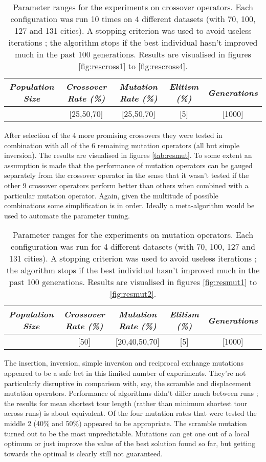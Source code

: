 \begin{table}[h]
\centering
\begin{tabular}{c|c|c|c|c}
\textit{Population Size} & \textit{Crossover Rate (\%)} & \textit{Mutation Rate (\%)} & \textit{Elitism (\%)} & \textit{Generations} \\\hline 
[300] & [25,50,70] & [25,50,70] & [5] & [1000]
\end{tabular}
\caption{Parameter ranges for the experiments on crossover operators. Each configuration was run 10 times on 4 different datasets (with 70, 100, 127 and 131 cities). A stopping criterion was used to avoid useless iterations ; the algorithm stops if the best individual hasn't improved much in the past 100 generations. Results are visualised in figures \ref{fig:rescross1} to \ref{fig:rescross4}.}
\label{tab:par2}
\end{table}

\par\noindent After selection of the 4 more promising crossovers they were tested in combination with all of the 6 remaining mutation operators (all but simple inversion). The results are visualised in figures \ref{tab:resmut}. To some extent an assumption is made that the performance of mutation operators can be gauged separately from the crossover operator in the sense that it wasn't tested if the other 9 crossover operators perform better than others when combined with a particular mutation operator. Again, given the multitude of possible combinations some simplification is in order. Ideally a meta-algorithm would be used to automate the parameter tuning.

\begin{table}[h]
\centering
\begin{tabular}{c|c|c|c|c}
\textit{Population Size} & \textit{Crossover Rate (\%)} & \textit{Mutation Rate (\%)} & \textit{Elitism (\%)} & \textit{Generations} \\\hline 
[300] & [50] & [20,40,50,70] & [5] & [1000]
\end{tabular}
\caption{Parameter ranges for the experiments on mutation operators. Each configuration was run for 4 different datasets (with 70, 100, 127 and 131 cities). A stopping criterion was used to avoid useless iterations ; the algorithm stops if the best individual hasn't improved much in the past 100 generations. Results are visualised in figures \ref{fig:resmut1} to \ref{fig:resmut2}.}
\label{tab:par3}
\end{table}

\noindent The insertion, inversion, simple inversion and reciprocal exchange mutations appeared to be a safe bet in this limited number of experiments. They're not particularly disruptive in comparison with, say, the scramble and displacement mutation operators. Performance of algorithms didn't differ much between runs ; the results for mean shortest tour length (rather than minimum shortest tour across runs) is about equivalent. Of the four mutation rates that were tested the middle 2 (40\% and 50\%) appeared to be appropriate. The scramble mutation turned out to be the most unpredictable. Mutations can get one out of a local optimum or just improve the value of the best solution found so far, but getting towards the optimal is clearly still not guaranteed.

